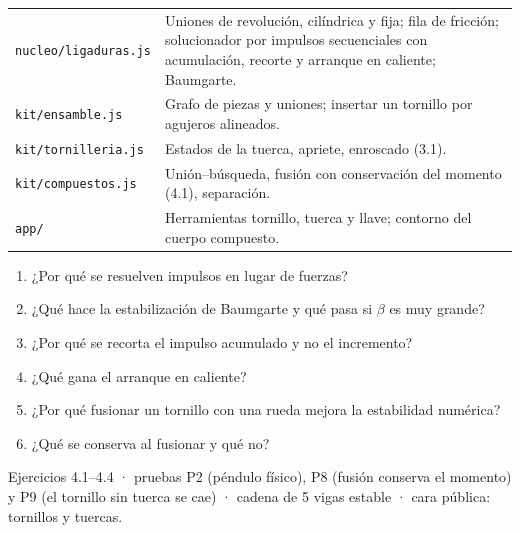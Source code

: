 \documentclass[11pt,a4paper]{article}
\begin{document}
\begin{codigo}
\begin{tabularx}{\linewidth}{@{}l Y@{}}
\texttt{nucleo/ligaduras.js} & Uniones de revolución, cilíndrica y fija; fila de fricción; solucionador por impulsos
  secuenciales con acumulación, recorte y arranque en caliente; Baumgarte.\\
\texttt{kit/ensamble.js} & Grafo de piezas y uniones; insertar un tornillo por agujeros alineados.\\
\texttt{kit/tornilleria.js} & Estados de la tuerca, apriete, enroscado (3.1).\\
\texttt{kit/compuestos.js} & Unión–búsqueda, fusión con conservación del momento (4.1), separación.\\
\texttt{app/} & Herramientas tornillo, tuerca y llave; contorno del cuerpo compuesto.\\
\end{tabularx}
\end{codigo}

\begin{control}
\begin{enumerate}[leftmargin=*]
  \item ¿Por qué se resuelven impulsos en lugar de fuerzas?
  \item ¿Qué hace la estabilización de Baumgarte y qué pasa si $\beta$ es muy grande?
  \item ¿Por qué se recorta el impulso acumulado y no el incremento?
  \item ¿Qué gana el arranque en caliente?
  \item ¿Por qué fusionar un tornillo con una rueda mejora la estabilidad numérica?
  \item ¿Qué se conserva al fusionar y qué no?
\end{enumerate}
\end{control}

\begin{cierre}
Ejercicios 4.1--4.4 · pruebas P2 (péndulo físico), P8 (fusión conserva el momento) y P9 (el tornillo sin tuerca se
cae) · cadena de 5 vigas estable · cara pública: tornillos y tuercas.
\end{cierre}
\end{document}
